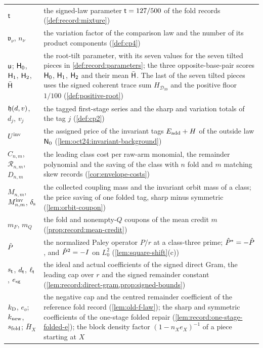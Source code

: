 \begin{longtable}{@{}>{\raggedright\arraybackslash}p{}%
>{\raggedright\arraybackslash}p{}@{}}
$\mathsf t$ & the signed-law parameter $\mathsf t=127/500$ of the fold records
 (\cref{def:record:mixture})\\
$\mathfrak v_\nu$, $n_\nu$ & the variation factor of the comparison law and
 the number of its product components (\cref{def:cp4})\\
$\mathsf u$; $\mathsf H_{0}$, $\mathsf H_{1}$, $\mathsf H_{2}$, $\bar{\mathsf H}$ & the root-tilt parameter, with
 its seven values for the seven tilted pieces in \cref{def:record:parameters};
 the three opposite-base-pair scores $\mathsf H_{0}$, $\mathsf H_{1}$, $\mathsf H_{2}$ and their mean
 $\bar{\mathsf H}$. The last of the seven tilted pieces uses the signed coherent trace
 sum $H_{\mathcal D_{39}}$ and the positive floor $1/100$
 (\cref{def:positive-root})\\
$\mathfrak h(d,v)$, $d_j$, $v_j$ & the tagged first-stage series and the sharp
 and variation totals of the tag $j$ (\cref{def:cp2})\\
$U^{\mathrm{inv}}$ & the assigned price of the invariant tags $E_{\rm add}+H$ of the
 outside law $\mathsf N_0$ (\cref{lem:oct24:invariant-background})\\
$C_{n,m}$, $\mathcal R_{n,m}$, $D_{n,m}$ & the leading class cost per raw-arm
 monomial, the remainder polynomial and the saving of the class with $n$ fold
 and $m$ matching skew records (\cref{cor:envelope-costs})\\
$M_{n,m}$, $M^{\rm inv}_{n,m}$, $\delta_{\rm s}$ & the collected coupling mass
 and the invariant orbit mass of a class; the price saving of one folded tag,
 sharp minus symmetric (\cref{lem:orbit-coupon})\\
$m_F$, $m_Q$ & the fold and nonempty-$Q$ coupons of the mean credit $m$
 (\cref{prop:record:mean-credit})\\
$\hat P$ & the normalized Paley operator $P/r$ at a class-three prime;
 $\hat P^*=-\hat P$, and $\hat P^2=-I$ on $L^2_0$ (\cref{lem:square-shift}(c))\\
$s_\mathsf t$, $d_\mathsf t$, $\ell_\mathsf t$, $e_{\rm sg}$ & the ideal and actual
 coefficients of the signed direct Gram, the leading cap over $r$ and the
 signed remainder constant (\cref{lem:record:direct-gram,prop:signed-bounds})\\
$k_{\rm D}$, $e_o$; $k_{\rm new}$, $s_{\rm fold}$; $\bar H_X$ & the negative
 cap and the centred remainder coefficient of the reference fold record
 (\cref{lem:old-f-law}); the sharp and symmetric coefficients of the one-stage
 folded repair (\cref{lem:record:one-stage-folded-e}); the block density
 factor $(1-n_Xe_X)^{-1}$ of a piece starting at $X$\\

\end{longtable}
